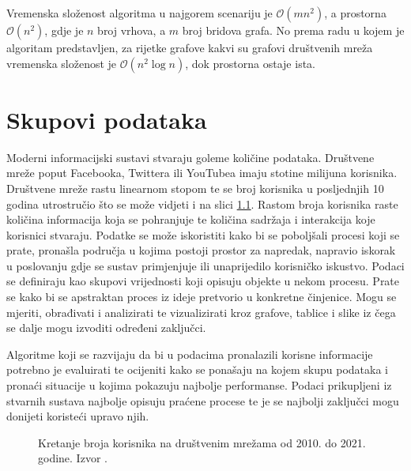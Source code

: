 \documentclass[times, utf8, diplomski]{fer}
\begin{document}
Vremenska složenost algoritma u najgorem scenariju je $\mathcal{O}(mn^{2})$, a prostorna $\mathcal{O}(n^{2})$, gdje je $n$ broj vrhova, a $m$ broj bridova grafa. No prema radu \cite{pons2005computing} u kojem je algoritam predstavljen, za rijetke grafove kakvi su grafovi društvenih mreža vremenska složenost je $\mathcal{O}(n^{2} \log n)$, dok prostorna ostaje ista.

%
\chapter{Skupovi podataka}

Moderni informacijski sustavi stvaraju goleme količine podataka. Društvene mreže poput Facebooka, Twittera ili YouTubea imaju stotine milijuna korisnika. Društvene mreže rastu linearnom stopom te se broj korisnika u posljednjih 10 godina utrostručio što se može vidjeti i na slici \ref{fig:users}. Rastom broja korisnika raste količina informacija koja se pohranjuje te količina sadržaja i interakcija koje korisnici stvaraju. Podatke se može iskoristiti kako bi se poboljšali procesi koji se prate, pronašla područja u kojima postoji prostor za napredak, napravio iskorak u poslovanju gdje se sustav primjenjuje ili unaprijedilo korisničko iskustvo. Podaci se definiraju kao skupovi vrijednosti koji opisuju objekte u nekom procesu. Prate se kako bi se apstraktan proces iz ideje pretvorio u konkretne činjenice. Mogu se mjeriti, obrađivati i analizirati te vizualizirati kroz grafove, tablice i slike iz čega se dalje mogu izvoditi određeni zaključci. 


Algoritme koji se razvijaju da bi u podacima pronalazili korisne informacije potrebno je evaluirati te ocijeniti kako se ponašaju na kojem skupu podataka i pronaći situacije u kojima pokazuju najbolje performanse. Podaci prikupljeni iz stvarnih sustava najbolje opisuju praćene procese te je se najbolji zaključci mogu donijeti koristeći upravo njih.

\begin{figure}
	\caption{Kretanje broja korisnika na društvenim mrežama od 2010. do 2021. godine. Izvor \cite{usersInWorld}.}
	\label{fig:users}
\end{figure}
\end{document}

